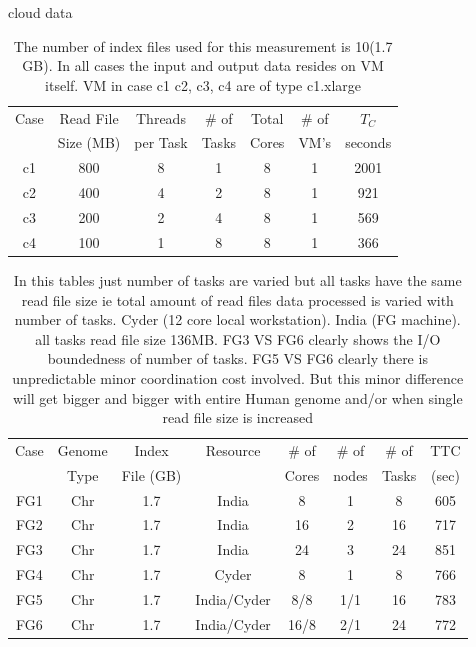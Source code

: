 \documentclass{article}
\begin{document}
cloud data
 \begin{table}
 \small
 \begin{tabular}{|c|c|c|c|c|c|c|} 
 \hline 
 Case&Read File&Threads  & \# of & Total & \# of  &  $T_C$  \\ 
     & Size (MB) & per Task & Tasks & Cores &  VM's & seconds \\ 
\hline
c1 & 800  &8 & 1 &  8 & 1 &2001  \\\hline
c2 & 400 &4 & 2 &  8 & 1 &921 \\\hline
c3 & 200 &2 & 4 &  8 & 1 &569 \\\hline
c4 & 100 &1 & 8 &  8 & 1 &366 \\\hline

\hline

 \end{tabular}

 \caption{ The number of index files used for this measurement is 10(1.7 GB).
   In all cases the input and output data resides on VM itself.  VM in
   case c1 c2, c3, c4 are of type c1.xlarge }
  \label{table:cloud-VM} 
\end{table}



\begin{table}
\scriptsize
 \begin{tabular}{|c|c|c|c|c|c|c|c|} 
 \hline 
Case &Genome & Index         & Resource    & \# of & \# of &   \# of         &	TTC  \\
  &Type               & File (GB)        & &Cores &   nodes &  Tasks&  (sec)\\  
\hline
FG1 &Chr &1.7& India	&	8& 1 & 8&605 \\
\hline
FG2 &Chr &1.7& India	&	16&2&16	&  717 \\
\hline
FG3 &Chr &1.7& India	&	24&3&24	&  851 \\
\hline
FG4 &Chr &1.7& Cyder &	8 & 1&8	& 766 \\
\hline
FG5 &Chr &1.7& India/Cyder &	8/8& 1/1& 16 & 783 \\
\hline
FG6 &Chr &1.7& India/Cyder &	16/8& 2/1& 24 & 772 \\
\hline

\end{tabular}
\caption{
In this tables just number of tasks are varied but all tasks have the same read file size ie total amount of  read files data processed is varied with number of tasks.
Cyder (12 core local workstation).
India (FG machine).
all tasks  read file size 136MB.
FG3 VS FG6 clearly shows the I/O boundedness of number of tasks.
FG5 VS FG6 clearly there is unpredictable minor coordination cost involved.
But this minor difference will get bigger and bigger with entire Human genome and/or when single read file  size is increased
}

  \label{table:NGS-Distributed} 
\end{table}
\end{document}
